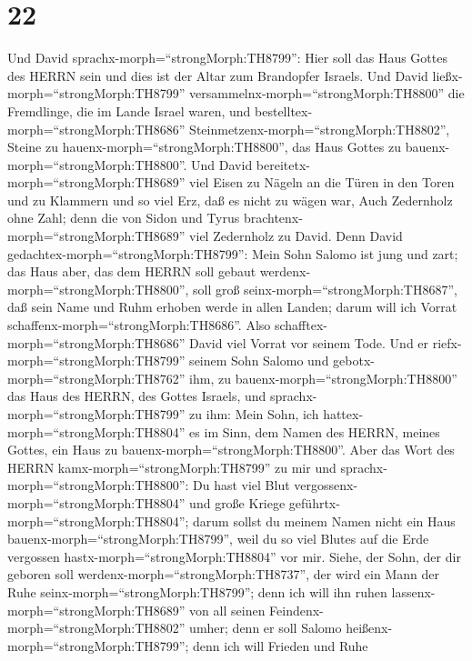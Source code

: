 \hypertarget{section-21}{%
\section{22}\label{section-21}}

 Und David sprachx-morph=``strongMorph:TH8799'': Hier soll
das Haus Gottes des HERRN sein und dies ist der Altar zum Brandopfer
Israels.  Und David ließx-morph=``strongMorph:TH8799''
versammelnx-morph=``strongMorph:TH8800'' die Fremdlinge, die im Lande
Israel waren, und bestelltex-morph=``strongMorph:TH8686''
Steinmetzenx-morph=``strongMorph:TH8802'', Steine zu
hauenx-morph=``strongMorph:TH8800'', das Haus Gottes zu
bauenx-morph=``strongMorph:TH8800''.  Und David
bereitetx-morph=``strongMorph:TH8689'' viel Eisen zu Nägeln an die Türen
in den Toren und zu Klammern und so viel Erz, daß es nicht zu wägen war,
 Auch Zedernholz ohne Zahl; denn die von Sidon und Tyrus
brachtenx-morph=``strongMorph:TH8689'' viel Zedernholz zu David.
 Denn David gedachtex-morph=``strongMorph:TH8799'': Mein
Sohn Salomo ist jung und zart; das Haus aber, das dem HERRN soll gebaut
werdenx-morph=``strongMorph:TH8800'', soll groß
seinx-morph=``strongMorph:TH8687'', daß sein Name und Ruhm erhoben werde
in allen Landen; darum will ich Vorrat
schaffenx-morph=``strongMorph:TH8686''. Also
schafftex-morph=``strongMorph:TH8686'' David viel Vorrat vor seinem
Tode.  Und er riefx-morph=``strongMorph:TH8799'' seinem Sohn
Salomo und gebotx-morph=``strongMorph:TH8762'' ihm, zu
bauenx-morph=``strongMorph:TH8800'' das Haus des HERRN, des Gottes
Israels,  und sprachx-morph=``strongMorph:TH8799'' zu ihm:
Mein Sohn, ich hattex-morph=``strongMorph:TH8804'' es im Sinn, dem Namen
des HERRN, meines Gottes, ein Haus zu
bauenx-morph=``strongMorph:TH8800''.  Aber das Wort des
HERRN kamx-morph=``strongMorph:TH8799'' zu mir und
sprachx-morph=``strongMorph:TH8800'': Du hast viel Blut
vergossenx-morph=``strongMorph:TH8804'' und große Kriege
geführtx-morph=``strongMorph:TH8804''; darum sollst du meinem Namen
nicht ein Haus bauenx-morph=``strongMorph:TH8799'', weil du so viel
Blutes auf die Erde vergossen hastx-morph=``strongMorph:TH8804'' vor
mir.  Siehe, der Sohn, der dir geboren soll
werdenx-morph=``strongMorph:TH8737'', der wird ein Mann der Ruhe
seinx-morph=``strongMorph:TH8799''; denn ich will ihn ruhen
lassenx-morph=``strongMorph:TH8689'' von all seinen
Feindenx-morph=``strongMorph:TH8802'' umher; denn er soll Salomo
heißenx-morph=``strongMorph:TH8799''; denn ich will Frieden und Ruhe
